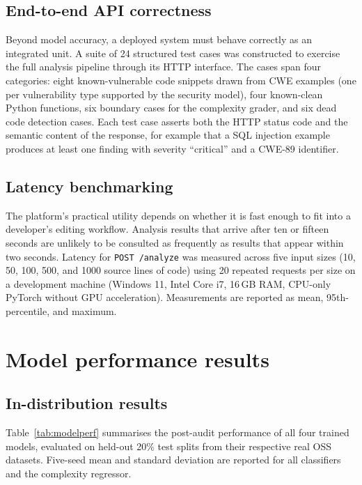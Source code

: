 \documentclass[12pt, oneside]{report}
\begin{document}
\subsection{End-to-end API correctness}
\label{ssec:api-testing}

Beyond model accuracy, a deployed system must behave correctly as an integrated unit.
A suite of 24 structured test cases was constructed to exercise the full analysis
pipeline through its HTTP interface. The cases span four categories: eight
known-vulnerable code snippets drawn from CWE examples (one per vulnerability type
supported by the security model), four known-clean Python functions, six boundary cases
for the complexity grader, and six dead code detection cases. Each test case
asserts both the HTTP status code and the semantic content of the response, for example that a SQL injection example produces at least one finding with severity ``critical''
and a CWE-89 identifier.

\subsection{Latency benchmarking}
\label{ssec:latency}

The platform's practical utility depends on whether it is fast enough to fit into a
developer's editing workflow. Analysis results that arrive after ten or fifteen seconds
are unlikely to be consulted as frequently as results that appear within two seconds.
Latency for \texttt{POST /analyze} was measured across five input sizes (10, 50, 100, 500, and 1000 source lines of code) using 20 repeated requests per size on a
development machine (Windows 11, Intel Core i7, 16\,GB RAM, CPU-only PyTorch without
GPU acceleration). Measurements are reported as mean, 95th-percentile, and maximum.

\section{Model performance results}
\label{sec:model-results}

\subsection{In-distribution results}

Table~\ref{tab:modelperf} summarises the post-audit performance of all four trained
models, evaluated on held-out 20\% test splits from their respective real OSS datasets.
Five-seed mean and standard deviation are reported for all classifiers and the
complexity regressor.
\end{document}
